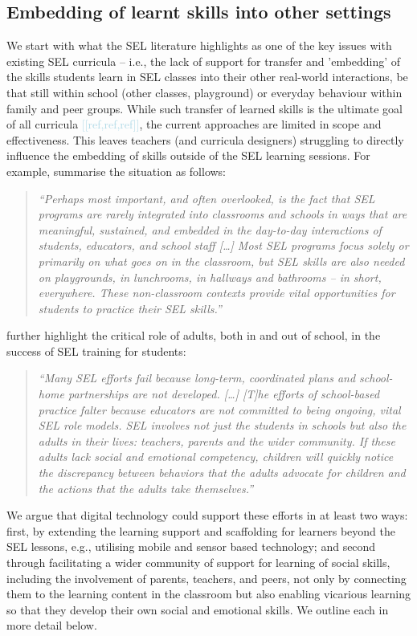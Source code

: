 \documentclass[prodmode,acmtochi]{acmsmall}
\newcommand{\todo}[1]{\textrm{\textrm{\textcolor{LightBlue}{[[#1]]}}}}
\newcommand{\qqq}[1]{\begin{quotation} \emph{``#1''} \end{quotation}}
\begin{document}
\subsection{Embedding of learnt skills into other settings}
\label{sec:embedding}
We start with what the SEL literature highlights as one of the key issues with existing SEL curricula -- i.e., the lack of support for transfer and 'embedding' of the skills students learn in SEL classes into their other real-world interactions, be that still within school (other classes, playground) or everyday behaviour within family and peer groups. 
%
While such transfer of learned skills is the ultimate goal of all curricula \todo{ref,ref,ref}, the current approaches are limited in scope and effectiveness. This leaves teachers (and curricula designers) struggling to directly influence the embedding of skills outside of the SEL learning sessions.
%
For example,  summarise the situation as follows: \qqq{Perhaps most important, and often overlooked, is the fact that SEL programs are rarely integrated into classrooms and schools in ways that are meaningful, sustained, and embedded in the day-to-day interactions of students, educators, and school staff [\dots] Most SEL programs focus solely or primarily on what goes on in the classroom, but SEL skills are also needed on playgrounds, in lunchrooms, in hallways and bathrooms -- in short, everywhere. These non-classroom contexts provide vital opportunities for students to practice their SEL skills.}
%
 further highlight the critical role of adults, both in and out of school, in the success of SEL training for students: \qqq{Many SEL efforts fail because long-term, coordinated plans and school-home partnerships are not developed. [\dots] [T]he efforts of school-based practice falter because educators are not committed to being ongoing, vital SEL role models. SEL involves not just the students in schools but also the adults in their lives: teachers, parents and the wider community. If these adults lack social and emotional competency, children will quickly notice the discrepancy between behaviors that the adults advocate for children and the actions that the adults take themselves.}



We argue that digital technology could support these efforts in at least two ways: first, by extending the learning support and scaffolding for learners beyond the SEL lessons, e.g., utilising mobile and sensor based technology; and second through facilitating a wider community of support for learning of social skills, including the involvement of parents, teachers, and peers, not only by connecting them to the learning content in the classroom but also enabling vicarious learning so that they develop their own social and emotional skills. We outline each in more detail below.
\end{document}
